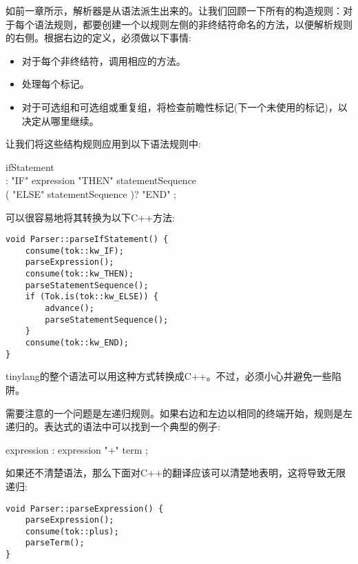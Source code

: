如前一章所示，解析器是从语法派生出来的。让我们回顾一下所有的构造规则：对于每个语法规则，都要创建一个以规则左侧的非终结符命名的方法，以便解析规则的右侧。根据右边的定义，必须做以下事情:\par

\begin{itemize}
\item 对于每个非终结符，调用相应的方法。
\item 处理每个标记。
\item 对于可选组和可选组或重复组，将检查前瞻性标记(下一个未使用的标记)，以决定从哪里继续。
\end{itemize}

让我们将这些结构规则应用到以下语法规则中:\par

\begin{tcolorbox}[colback=white,colframe=black]
ifStatement \\
\hspace*{0.5cm}: "IF" expression "THEN" statementSequence \\
\hspace*{1cm}( "ELSE" statementSequence )? "END" ;
\end{tcolorbox}

可以很容易地将其转换为以下C++方法:\par

\begin{lstlisting}[caption={}]
void Parser::parseIfStatement() {
	consume(tok::kw_IF);
	parseExpression();
	consume(tok::kw_THEN);
	parseStatementSequence();
	if (Tok.is(tok::kw_ELSE)) {
		advance();
		parseStatementSequence();
	}
	consume(tok::kw_END);
}
\end{lstlisting}

tinylang的整个语法可以用这种方式转换成C++。不过，必须小心并避免一些陷阱。\par

需要注意的一个问题是左递归规则。如果右边和左边以相同的终端开始，规则是左递归的。表达式的语法中可以找到一个典型的例子:\par

\begin{tcolorbox}[colback=white,colframe=black]
expression : expression "+" term ;
\end{tcolorbox}

如果还不清楚语法，那么下面对C++的翻译应该可以清楚地表明，这将导致无限递归:\par

\begin{lstlisting}[caption={}]
void Parser::parseExpression() {
	parseExpression();
	consume(tok::plus);
	parseTerm();
}
\end{lstlisting}

